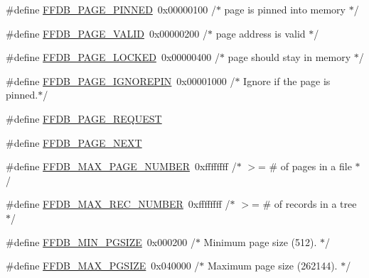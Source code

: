\begin{DoxyCompactItemize}
\item 
\#define \mbox{\hyperlink{adat-devel_2other__libs_2filedb_2filehash_2ffdb__pagepool_8h_a440c42c39023ec7bc703c1ee7cf9d31d}{F\+F\+D\+B\+\_\+\+P\+A\+G\+E\+\_\+\+P\+I\+N\+N\+ED}}~0x00000100	/$\ast$ page is pinned into memory $\ast$/
\item 
\#define \mbox{\hyperlink{adat-devel_2other__libs_2filedb_2filehash_2ffdb__pagepool_8h_a0b245e3a64286e83e0dabe70b18d82ca}{F\+F\+D\+B\+\_\+\+P\+A\+G\+E\+\_\+\+V\+A\+L\+ID}}~0x00000200	/$\ast$ page address is valid $\ast$/
\item 
\#define \mbox{\hyperlink{adat-devel_2other__libs_2filedb_2filehash_2ffdb__pagepool_8h_aec5c29834d2c61a4ad84c4a619241184}{F\+F\+D\+B\+\_\+\+P\+A\+G\+E\+\_\+\+L\+O\+C\+K\+ED}}~0x00000400	/$\ast$ page should stay in memory $\ast$/
\item 
\#define \mbox{\hyperlink{adat-devel_2other__libs_2filedb_2filehash_2ffdb__pagepool_8h_a358b2174963715fbd8106a5b18dba4a5}{F\+F\+D\+B\+\_\+\+P\+A\+G\+E\+\_\+\+I\+G\+N\+O\+R\+E\+P\+IN}}~0x00001000	/$\ast$ Ignore if the page is pinned.$\ast$/
\item 
\#define \mbox{\hyperlink{adat-devel_2other__libs_2filedb_2filehash_2ffdb__pagepool_8h_aadf1f5e267ceac2e911909dbb47d5b1f}{F\+F\+D\+B\+\_\+\+P\+A\+G\+E\+\_\+\+R\+E\+Q\+U\+E\+ST}}
\item 
\#define \mbox{\hyperlink{adat-devel_2other__libs_2filedb_2filehash_2ffdb__pagepool_8h_a85efbea251f47f544fa98e5fb0efba8a}{F\+F\+D\+B\+\_\+\+P\+A\+G\+E\+\_\+\+N\+E\+XT}}
\item 
\#define \mbox{\hyperlink{adat-devel_2other__libs_2filedb_2filehash_2ffdb__pagepool_8h_a16ce97daaa82305f17c46ade9d36bead}{F\+F\+D\+B\+\_\+\+M\+A\+X\+\_\+\+P\+A\+G\+E\+\_\+\+N\+U\+M\+B\+ER}}~0xffffffff	/$\ast$ $>$= \# of pages in a file $\ast$/
\item 
\#define \mbox{\hyperlink{adat-devel_2other__libs_2filedb_2filehash_2ffdb__pagepool_8h_a9397310c76ad6c71d34754a00f7b8a71}{F\+F\+D\+B\+\_\+\+M\+A\+X\+\_\+\+R\+E\+C\+\_\+\+N\+U\+M\+B\+ER}}~0xffffffff	/$\ast$ $>$= \# of records in a tree $\ast$/
\item 
\#define \mbox{\hyperlink{adat-devel_2other__libs_2filedb_2filehash_2ffdb__pagepool_8h_a4ec72f941ddb4abac0537aad839ae0d1}{F\+F\+D\+B\+\_\+\+M\+I\+N\+\_\+\+P\+G\+S\+I\+ZE}}~0x000200   /$\ast$ Minimum page size (512). $\ast$/
\item 
\#define \mbox{\hyperlink{adat-devel_2other__libs_2filedb_2filehash_2ffdb__pagepool_8h_a160d085e2bf39c78d1adf6e1af9e7d60}{F\+F\+D\+B\+\_\+\+M\+A\+X\+\_\+\+P\+G\+S\+I\+ZE}}~0x040000   /$\ast$ Maximum page size (262144). $\ast$/

\end{DoxyCompactItemize}

